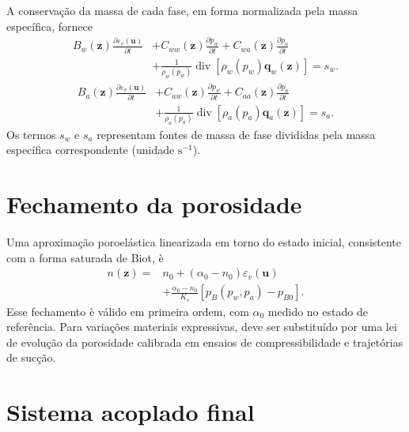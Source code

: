 \documentclass[11pt,a4paper]{article}
\newcommand{\Div}{\operatorname{div}}
\begin{document}
A conserva\c{c}\~ao da massa de cada fase, em forma normalizada pela
massa espec\'ifica, fornece
\begin{equation*}
\boxed{\begin{aligned}
B_w(\mathbf z)\frac{\partial\varepsilon_v(\mathbf u)}{\partial t}
&+C_{ww}(\mathbf z)\frac{\partial p_w}{\partial t}
+C_{wa}(\mathbf z)\frac{\partial p_a}{\partial t}\\
&+\frac{1}{\rho_w(p_w)}\Div\left[\rho_w(p_w)\mathbf q_w(\mathbf z)\right]=s_w.
\end{aligned}}
\end{equation*}
\begin{equation*}
\boxed{\begin{aligned}
B_a(\mathbf z)\frac{\partial\varepsilon_v(\mathbf u)}{\partial t}
&+C_{aw}(\mathbf z)\frac{\partial p_w}{\partial t}
+C_{aa}(\mathbf z)\frac{\partial p_a}{\partial t}\\
&+\frac{1}{\rho_a(p_a)}\Div\left[\rho_a(p_a)\mathbf q_a(\mathbf z)\right]=s_a.
\end{aligned}}
\end{equation*}
Os termos $s_w$ e $s_a$ representam fontes de massa de fase divididas
pela massa espec\'ifica correspondente (unidade $\mathrm{s}^{-1}$).

\section{Fechamento da porosidade}

Uma aproxima\c{c}\~ao poroel\'astica linearizada em torno do estado
inicial, consistente com a forma saturada de Biot, \`e
\begin{equation*}
\boxed{\begin{aligned}
n(\mathbf z)={}&n_0+(\alpha_0-n_0)\varepsilon_v(\mathbf u)\\
&+\frac{\alpha_0-n_0}{K_s}
\left[p_B(p_w,p_a)-p_{B0}\right].
\end{aligned}}
\end{equation*}
Esse fechamento \`e v\'alido em primeira ordem, com $\alpha_0$ medido
no estado de refer\^encia. Para varia\c{c}\~oes materiais expressivas,
deve ser substitu\'ido por uma lei de evolu\c{c}\~ao da porosidade
calibrada em ensaios de compressibilidade e trajet\'orias de suc\c{c}\~ao.

\section{Sistema acoplado final}
\end{document}

